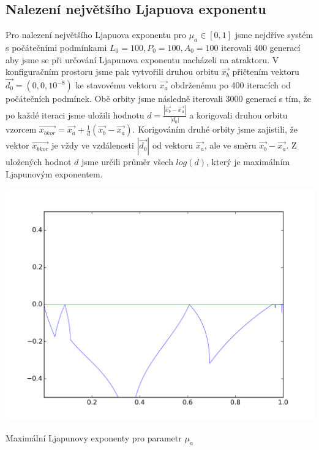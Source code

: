 \documentclass[a4paper, 12pt]{article}
\begin{document}
\subsection{Nalezení největšího Ljapuova exponentu}
Pro nalezení největšího Ljapuova exponentu pro $\mu_a\in[0,1]$ jsme nejdříve systém s počátečními podmínkami $L_0=100, P_0=100, A_0=100$ iterovali 400 generací aby jsme se při určování Ljapunova exponentu nacházeli na atraktoru. V konfiguračním prostoru jsme pak vytvořili druhou orbitu $\vec{x_b}$ přičtením vektoru $\vec{d_0}=\left(0,0,10^{-8}\right)$ ke stavovému vektoru $\vec{x_a}$ obdrženému po 400 iteracích od počátečních podmínek. Obě orbity jsme následně iterovali 3000 generací s tím, že po každé iteraci jsme uložili hodnotu $d=\frac{|\vec{x_b}-\vec{x_a}|}{|d_0|}$ a korigovali druhou orbitu vzorcem $\vec{x_{bkor}}=\vec{x_a}+\frac{1}{d}\left(\vec{x_b}-\vec{x_a}\right)$. Korigováním druhé orbity jsme zajistili, že vektor $\vec{x_{bkor}}$ je vždy ve vzdálenosti $|\vec{d_0}|$ od vektoru $\vec{x_a}$, ale ve směru $\vec{x_b}-\vec{x_a}$. Z uložených hodnot $d$ jsme určili průměr všech $log(d)$, který je maximálním Ljapunovým exponentem. 

\begin{graph}[H]
	\centering
\includegraphics[width=\textwidth]{grafy/mua_f_wid.png}
\vspace{-10pt}
\caption{Maximální Ljapunovy exponenty pro parametr $\mu_a$}
\label{fig:lyapunov_mua}
\end{graph}
\end{document}
